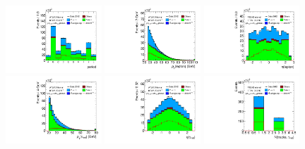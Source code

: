 \begin{figure}[tp]
  \centering
  \includegraphics[width=0.32\textwidth]{figures/presel/period}
  \includegraphics[width=0.32\textwidth]{figures/presel/lep-pt-hi}
  \includegraphics[width=0.32\textwidth]{figures/presel/lep-eta} \\
  \includegraphics[width=0.32\textwidth]{figures/presel/tau-pt}
  \includegraphics[width=0.32\textwidth]{figures/presel/tau-eta}
  \includegraphics[width=0.32\textwidth]{figures/presel/tau-numTrack} \\

\end{figure}
